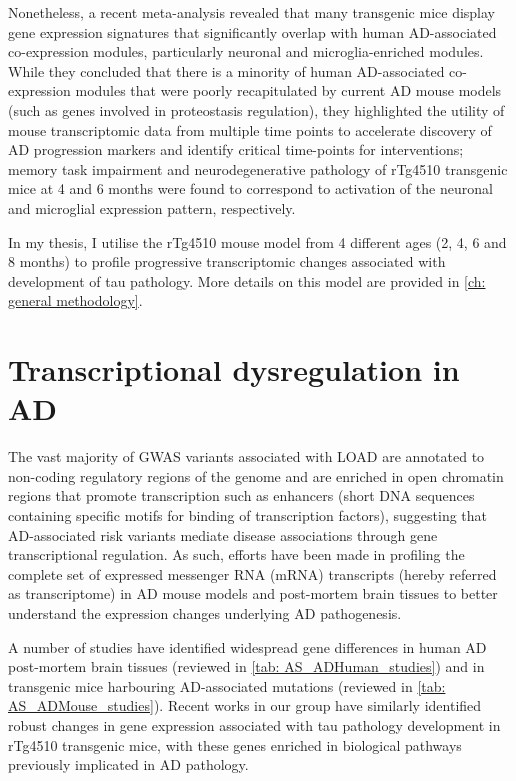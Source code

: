 Nonetheless, a recent meta-analysis revealed that many transgenic mice display gene expression signatures that significantly overlap with human AD-associated co-expression modules, particularly neuronal and microglia-enriched modules\cite{Wan2020}. While they concluded that there is a minority of human AD-associated co-expression modules that were poorly recapitulated by current AD mouse models (such as genes involved in proteostasis regulation), they highlighted the utility of mouse transcriptomic data from multiple time points to accelerate discovery of AD progression markers and identify critical time-points for interventions; memory task impairment and neurodegenerative pathology of rTg4510 transgenic mice at 4 and 6 months were found to correspond to activation of the neuronal and microglial expression pattern, respectively. 

In my thesis, I utilise the rTg4510 mouse model from 4 different ages (2, 4, 6 and 8 months) to profile progressive transcriptomic changes associated with development of tau pathology. More details on this model are provided in \cref{ch: general methodology}. 


\clearpage
\section{Transcriptional dysregulation in AD}

The vast majority of GWAS variants associated with LOAD are annotated to non-coding regulatory regions of the genome and are enriched in open chromatin regions that promote transcription such as enhancers\cite{Kikuchi2019} (short DNA sequences containing specific motifs for binding of transcription factors), suggesting that AD-associated risk variants mediate disease associations through gene transcriptional regulation. As such, efforts have been made in profiling the complete set of expressed messenger RNA (mRNA) transcripts (hereby referred as transcriptome) in AD mouse models and post-mortem brain tissues to better understand the expression changes underlying AD pathogenesis. 

A number of studies have identified widespread gene differences in human AD post-mortem brain tissues (reviewed in \cref{tab: AS_ADHuman_studies}) and in transgenic mice harbouring AD-associated mutations (reviewed in \cref{tab: AS_ADMouse_studies}). Recent works in our group have similarly identified robust changes in gene expression associated with tau pathology development in rTg4510 transgenic mice, with these genes enriched in biological pathways previously implicated in AD pathology\cite{Castanho2020}. 

